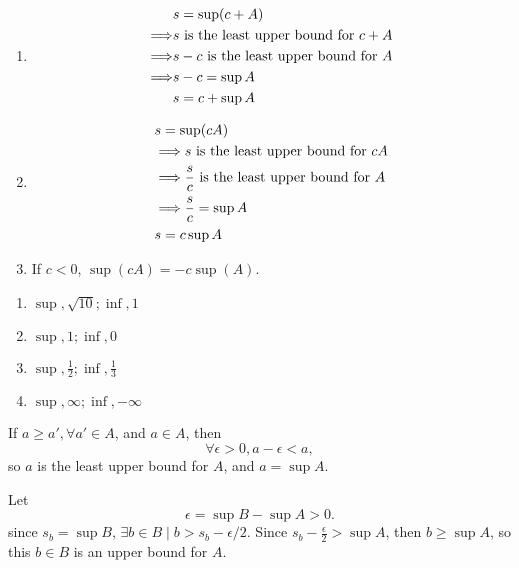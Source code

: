 \begin{exercise}
	\begin{enumerate}[label=(\alph*)]
		\item \begin{align*}
		&s = \sup(c + A) \\
		\Longrightarrow &s \text{ is the least upper bound for } c + A \\
		\Longrightarrow &s - c \text{ is the least upper bound for } A \\
		\Longrightarrow &s - c = \sup A \\
		&s = c + \sup A
	\end{align*}
		\item \begin{align*}
			&s = \sup(cA) \\
			&\Longrightarrow s \text{ is the least upper bound for } cA \\
			&\Longrightarrow \frac{s}{c} \text{ is the least upper bound for } A \\
			&\Longrightarrow \frac{s}{c} = \sup A \\
			&s = c \sup A
		\end{align*}
		\item If $c < 0$, $\sup(cA) = -c\sup(A)$.
	\end{enumerate}
\end{exercise}

\begin{exercise}
\begin{enumerate}[label=(\alph*)]
	\item $\sup, \sqrt{10}; \inf, 1$
	\item $\sup, 1; \inf, 0$
	\item $\sup, \frac{1}{2}; \inf, \frac{1}{3}$
	\item $\sup, \infty; \inf, -\infty$
\end{enumerate}
\end{exercise}

\begin{exercise}
	If $a \geq a', \forall a' \in A$, and $a \in A$, then
	\begin{equation}
		\forall \epsilon > 0, a - \epsilon < a,
	\end{equation}
	so $a$ is the least upper bound for $A$, and $a = \sup A$.
\end{exercise}

\begin{exercise}
	Let \begin{equation}
	\epsilon = \sup B - \sup A > 0.
	\end{equation}
	since $s_b = \sup B$, $\exists b \in B \mid b > s_b - \epsilon / 2$. Since $s_b - \frac{\epsilon}{2} > \sup A$, then $b \geq \sup A$, so this $b \in B$ is an upper bound for $A$.
\end{exercise}

